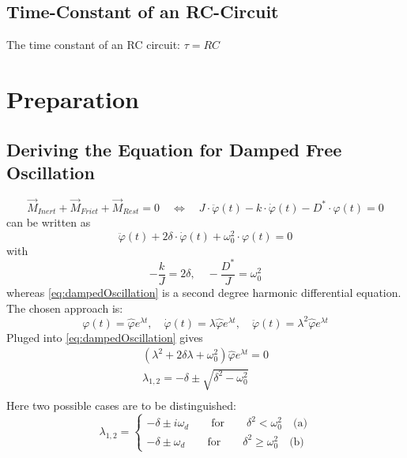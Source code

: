     \subsection*{Time-Constant of an RC-Circuit}
        The time constant of an RC circuit: \(\tau = RC\)
\section{Preparation}
%
    \subsection*{Deriving the Equation for Damped Free Oscillation}\label{sec:preparation_task_1}
        \begin{equation}
            \vec{M}_{ Inert } + \vec{M}_{ Frict } + \vec{ M}_{ Rest } = 0 \quad \Leftrightarrow \quad J \cdot \ddot\varphi(t) - k \cdot \dot\varphi(t) - D^* \cdot \varphi(t) = 0
        \end{equation}
        can be written as
        \begin{equation}
            \ddot\varphi(t) + 2 \delta \cdot \dot\varphi(t) + \omega_0^2 \cdot \varphi(t) = 0
            \label{eq:dampedOscillation}
        \end{equation}
        with
        \begin{equation}
            -\frac{k}{J} = 2\delta, \quad -\frac{D^*}{J} = \omega_0^2
            \label{eq:DEParameters}
        \end{equation}
        whereas \cref{eq:dampedOscillation} is a second degree harmonic differential equation.
        The chosen approach is:
        \begin{equation}
            \varphi(t) = \hat{\varphi} e^{\lambda t}, \quad \dot{\varphi}(t) = \lambda \hat{\varphi} e^{\lambda t}, \quad \ddot{\varphi}(t) = \lambda^2 \hat{\varphi} e^{\lambda t}
        \end{equation}
        Pluged into \cref{eq:dampedOscillation} gives
        \begin{align}
            \left(\lambda^2 + 2\delta \lambda + \omega_0^2\right) \hat{\varphi}e^{\lambda t} = 0 \nonumber \\
            \lambda_{1,2} = -\delta \pm \sqrt{\delta^2-\omega_0^2} \nonumber \\
        \end{align}
        Here two possible cases are to be distinguished:
        \begin{equation}
            \lambda_{1,2} =
            \begin{cases}
                    -\delta \pm i\omega_d \qquad \text{for} \qquad \delta^2 < \omega_0^2 \quad \text{(a)}\\
                    -\delta \pm \omega_d \qquad \text{for} \qquad \delta^2 \geq \omega_0^2 \quad \text{(b)}
            \end{cases}
            \end{equation}
